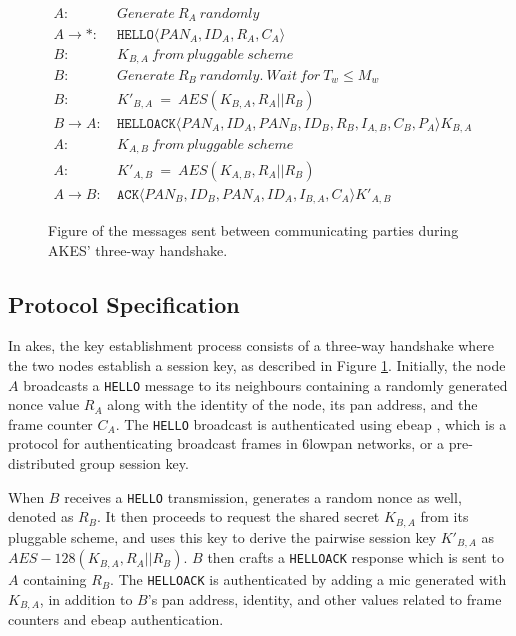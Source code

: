 \begin{figure}[h]
\begin{tcolorbox}[title=Three-way handshake in AKES]
\begin{align*}
A:\ & Generate\ R_A\ randomly\\
A \rightarrow *:\ & \texttt{HELLO}\langle{PAN_A, ID_A, R_A, C_A}\rangle{}\\
B:\ & K_{B,A}\ from\ pluggable\ scheme\\
B:\ & Generate\ R_B\ randomly.\ Wait\ for\ T_w \leq M_w\\
B:\ & K'_{B,A}\ =\ AES(K_{B,A}, R_A || R_B)\\
B \rightarrow A:\ & \texttt{HELLOACK}\langle{PAN_A, ID_A, PAN_B, ID_B, R_B, I_{A,B}, C_B, P_A}\rangle{K_{B,A}}\\
A:\ & K_{A,B}\ from\ pluggable\ scheme\\
A:\ & K'_{A,B}\ =\ AES(K_{A,B}, R_A || R_B)\\
A \rightarrow B:\ & \texttt{ACK}\langle{PAN_B, ID_B, PAN_A, ID_A, I_{B,A}, C_A}\rangle{K'_{A,B}}
\end{align*}
\end{tcolorbox}
\caption{Figure of the messages sent between communicating parties during AKES' three-way handshake.}
\label{fig:akes-handshake}
\end{figure}

\subsection{Protocol Specification}
\label{subsec:akes-specs}

In \gls{akes}, the key establishment process consists of a three-way handshake where the two nodes establish a session key, as described in Figure \ref{fig:akes-handshake}. Initially, the node $A$ broadcasts a \texttt{HELLO} message to its neighbours containing a randomly generated nonce value $R_A$ along with the identity of the node, its \gls{pan} address, and the frame counter $C_A$. The \texttt{HELLO} broadcast is authenticated using \gls{ebeap} \cite{krentz20136lowpan}, which is a protocol for authenticating broadcast frames in \gls{6lowpan} networks, or a pre-distributed group session key.

When $B$ receives a \texttt{HELLO} transmission, generates a random nonce as well, denoted as $R_B$. It then proceeds to request the shared secret $K_{B,A}$ from its pluggable scheme, and uses this key to derive the pairwise session key $K'_{B,A}$ as $AES-128(K_{B,A}, R_A || R_B)$. $B$ then crafts a \texttt{HELLOACK} response which is sent to $A$ containing $R_B$. The \texttt{HELLOACK} is authenticated by adding a \gls{mic} generated with $K_{B,A}$, in addition to $B$'s \gls{pan} address, identity, and other values related to frame counters and \gls{ebeap} authentication.

